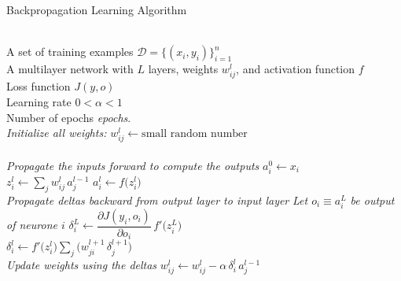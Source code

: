 \begin{breakablealgorithm}
\caption{Backpropagation Learning Algorithm}
\begin{algorithmic}
\Require \\
A set of training examples $\mathcal{D} = \{(x_i, y_i)\}_{i=1}^n$\\
A multilayer network with $L$ layers, weights $w_{ij}^l$, and activation function $f$\\
Loss function $J(y, o)$\\
Learning rate $0 < \alpha < 1$\\
Number of epochs \textit{epochs}.\\
    
\State \textit{Initialize all weights:} 
\State $w_{ij}^l \gets \text{small random number}$
\EndFor\\

\\
\State \textit{Propagate the inputs forward to compute the outputs}
\State $a_i^0 \gets x_i$
\EndFor \\
\State $z_i^l \gets \displaystyle\sum_j w_{ij}^l\,a_j^{l-1}$
\State $a_i^l \gets f\bigl(z_i^l\bigr)$
\EndFor
\EndFor\\

\State \textit{Propagate deltas backward from output layer to input layer}
\State \textit{Let  $o_i \equiv a_i^L$ be output of neurone $i$}
\State $\delta_i^L \gets \dfrac{\partial J(y_i,o_i)}{\partial o_i}\,f'\bigl(z_i^L\bigr)$
\EndFor\\
\State $\delta_i^l \gets f'\bigl(z_i^l\bigr) \sum_j\bigl(w_{ji}^{l+1}\,\delta_j^{l+1}\bigr)$
\EndFor
\EndFor\\

\State \textit{Update weights using the deltas}
\State $w_{ij}^l \gets w_{ij}^l - \alpha\,\delta_i^l\,a_j^{l-1}$
      \EndFor
    \EndFor
  \EndFor
\end{algorithmic}
\end{breakablealgorithm}



